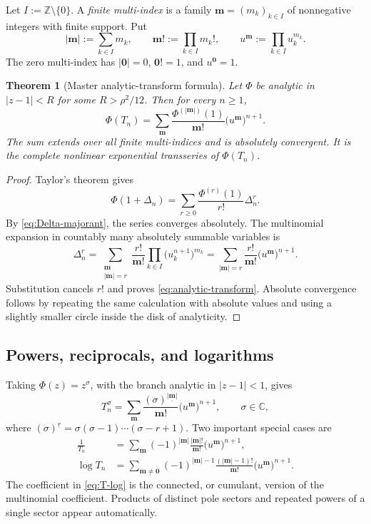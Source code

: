 \documentclass[11pt,a4paper,oneside]{article}
\newtheorem{theorem}{Theorem}[section]
\theoremstyle{definition}
\theoremstyle{remark}
\newcommand{\falling}[2]{(#1)^{\underline{#2}}}
\begin{document}
Let $I:=\mathbb Z\setminus\{0\}$.  A \emph{finite multi-index} is a family
$\bm m=(m_k)_{k\in I}$ of nonnegative integers with finite support.  Put
\[
 |\bm m|:=\sum_{k\in I}m_k,
 \qquad
 \bm m!:=\prod_{k\in I}m_k!,
 \qquad
 u^{\bm m}:=\prod_{k\in I}u_k^{m_k}.
\]
The zero multi-index has $|\bm0|=0$, $\bm0!=1$, and $u^{\bm0}=1$.

\begin{theorem}[Master analytic-transform formula]\label{thm:analytic-transform}
Let $\Phi$ be analytic in $|z-1|<R$ for some
$R>\rho^2/12$.  Then for every $n\ge1$,
\begin{equation}\label{eq:analytic-transform}
 \boxed{\displaystyle
 \Phi(T_n)=
 \sum_{\bm m}
 \frac{\Phi^{(|\bm m|)}(1)}{\bm m!}
 \bigl(u^{\bm m}\bigr)^{n+1}.}
\end{equation}
The sum extends over all finite multi-indices and is absolutely convergent.
It is the complete nonlinear exponential transseries of $\Phi(T_n)$.
\end{theorem}

\begin{proof}
Taylor's theorem gives
\[
 \Phi(1+\Delta_n)=\sum_{r\ge0}\frac{\Phi^{(r)}(1)}{r!}\Delta_n^r.
\]
By \cref{eq:Delta-majorant}, the series converges absolutely.  The multinomial
expansion in countably many absolutely summable variables is
\[
 \Delta_n^r
 =\sum_{\substack{\bm m\\|\bm m|=r}}
   \frac{r!}{\bm m!}
   \prod_{k\in I}\bigl(u_k^{n+1}\bigr)^{m_k}
 =\sum_{|\bm m|=r}\frac{r!}{\bm m!}
   \bigl(u^{\bm m}\bigr)^{n+1}.
\]
Substitution cancels $r!$ and proves \cref{eq:analytic-transform}.  Absolute
convergence follows by repeating the same calculation with absolute values
and using a slightly smaller circle inside the disk of analyticity.
\end{proof}

\subsection{Powers, reciprocals, and logarithms}
Taking $\Phi(z)=z^\sigma$, with the branch analytic in $|z-1|<1$, gives
\begin{equation}\label{eq:T-power}
 T_n^\sigma
 =\sum_{\bm m}
   \frac{\falling{\sigma}{|\bm m|}}{\bm m!}
   \bigl(u^{\bm m}\bigr)^{n+1},
 \qquad \sigma\in\mathbb C,
\end{equation}
where
\(
 \falling{\sigma}{r}=\sigma(\sigma-1)\cdots(\sigma-r+1)
\).
Two important special cases are
\begin{align}
 \frac1{T_n}
 &=\sum_{\bm m}(-1)^{|\bm m|}
       \frac{|\bm m|!}{\bm m!}
       \bigl(u^{\bm m}\bigr)^{n+1},
 \label{eq:T-reciprocal}\\
 \log T_n
 &=\sum_{\bm m\ne\bm0}(-1)^{|\bm m|-1}
       \frac{(|\bm m|-1)!}{\bm m!}
       \bigl(u^{\bm m}\bigr)^{n+1}.
 \label{eq:T-log}
\end{align}
The coefficient in \cref{eq:T-log} is the connected, or cumulant, version of
the multinomial coefficient.  Products of distinct pole sectors and repeated
powers of a single sector appear automatically.
\end{document}
